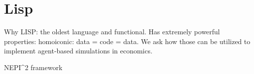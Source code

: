 
\chapter{Lisp} 
Why LISP: the oldest language and functional. Has extremely powerful properties: homoiconic: data = code = data. We ask how those can be utilized to implement agent-based simulations in economics.

NEPI^2 framework